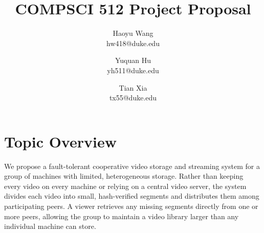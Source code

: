 




\date{}

\title{\Large \bf COMPSCI 512 Project Proposal}

\author{
{\rm Haoyu Wang}\\
hw418@duke.edu
\and
{\rm Yuquan Hu}\\
yh511@duke.edu
\and
{\rm Tian Xia}\\
tx55@duke.edu
} %

\maketitle



\section{Topic Overview}
We propose a fault-tolerant cooperative video storage and streaming system for a group of machines with limited, heterogeneous storage. Rather than keeping every video on every machine or relying on a central video server, the system divides each video into small, hash-verified segments and distributes them among participating peers. A viewer retrieves any missing segments directly from one or more peers, allowing the group to maintain a video library larger than any individual machine can store.

